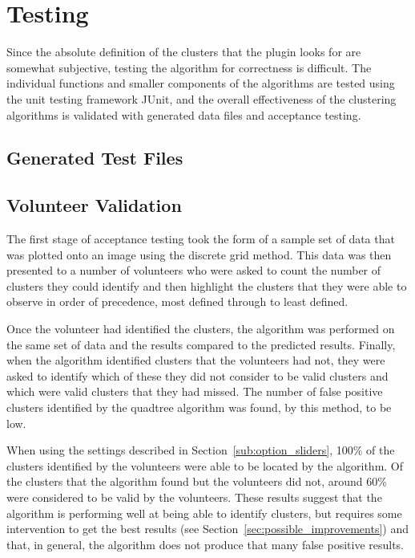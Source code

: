 
\section{Testing}
\label{sec:testing}

Since the absolute definition of the clusters that the plugin looks for are
somewhat subjective, testing the algorithm for correctness is difficult. The
individual functions and smaller components of the algorithms are tested using
the unit testing framework JUnit\cite{tahchiev2010junit}, and the overall
effectiveness of the clustering algorithms is validated with generated data
files and acceptance testing.

\subsection{Generated Test Files}
\label{sub:generated_test_files}


\subsection{Volunteer Validation}
\label{sub:volunteer_validation}

The first stage of acceptance testing took the form of a sample set of data
that was plotted onto an image using the discrete grid method. This data was
then presented to a number of volunteers who were asked to count the number of
clusters they could identify and then highlight the clusters that they were
able to observe in order of precedence, most defined through to least defined.

Once the volunteer had identified the clusters, the algorithm was performed on
the same set of data and the results compared to the predicted results.
Finally, when the algorithm identified clusters that the volunteers had not,
they were asked to identify which of these they did not consider to be valid
clusters and which were valid clusters that they had missed. The number of
false positive clusters identified by the quadtree algorithm was found, by this
method, to be low.

When using the settings described in Section~\ref{sub:option_sliders}, 100\% of
the clusters identified by the volunteers were able to be located by the
algorithm. Of the clusters that the algorithm found but the volunteers did not,
around 60\% were considered to be valid by the volunteers. These results
suggest that the algorithm is performing well at being able to identify
clusters, but requires some intervention to get the best results (see
Section~\ref{sec:possible_improvements}) and that, in general, the algorithm
does not produce that many false positive results.

